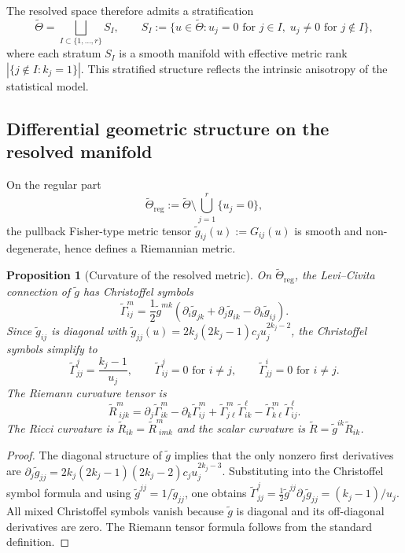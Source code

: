 \documentclass[11pt,letterpaper]{amsart}
\numberwithin{equation}{section}
\theoremstyle{plain}
\newtheorem{proposition}[theorem]{Proposition}
\theoremstyle{definition}
\theoremstyle{remark}
\begin{document}
The resolved space therefore admits a stratification
\[
\widetilde{\Theta} = \bigsqcup_{I \subset \{1,\dots,r\}} S_I,
\qquad
S_I := \{ u \in \widetilde{\Theta} : u_j = 0 \text{ for } j \in I, \; u_j \neq 0 \text{ for } j \notin I \},
\]
where each stratum $S_I$ is a smooth manifold with effective metric rank $|\{j \notin I : k_j = 1\}|$. This stratified structure reflects the intrinsic anisotropy of the statistical model.

\subsection{Differential geometric structure on the resolved manifold}

On the regular part
\[
\widetilde{\Theta}_{\mathrm{reg}} := \widetilde{\Theta} \setminus \bigcup_{j=1}^r \{u_j = 0\},
\]
the pullback Fisher-type metric tensor $\widetilde{g}_{ij}(u) := G_{ij}(u)$ is smooth and non-degenerate, hence defines a Riemannian metric.

\begin{proposition}[Curvature of the resolved metric]
\label{prop:curvature_resolved}
On $\widetilde{\Theta}_{\mathrm{reg}}$, the Levi--Civita connection of $\widetilde{g}$ has Christoffel symbols
\[
\widetilde{\Gamma}^m_{ij}
=
\frac{1}{2} \widetilde{g}^{mk}
\left(
\partial_i \widetilde{g}_{jk}
+
\partial_j \widetilde{g}_{ik}
-
\partial_k \widetilde{g}_{ij}
\right).
\]
Since $\widetilde{g}_{ij}$ is diagonal with $\widetilde{g}_{jj}(u) = 2k_j(2k_j-1)c_j u_j^{2k_j-2}$, the Christoffel symbols simplify to
\[
\widetilde{\Gamma}^j_{jj} = \frac{k_j - 1}{u_j}, \qquad
\widetilde{\Gamma}^j_{ij} = 0 \text{ for } i \neq j, \qquad
\widetilde{\Gamma}^i_{jj} = 0 \text{ for } i \neq j.
\]
The Riemann curvature tensor is
\[
\widetilde{R}^m_{\,\,ijk}
=
\partial_j \widetilde{\Gamma}^m_{ik}
-
\partial_k \widetilde{\Gamma}^m_{ij}
+
\widetilde{\Gamma}^m_{j\ell} \widetilde{\Gamma}^\ell_{ik}
-
\widetilde{\Gamma}^m_{k\ell} \widetilde{\Gamma}^\ell_{ij}.
\]
The Ricci curvature is $\widetilde{R}_{ik} = \widetilde{R}^m_{\,\,imk}$ and the scalar curvature is $\widetilde{R} = \widetilde{g}^{ik} \widetilde{R}_{ik}$.
\end{proposition}

\begin{proof}
The diagonal structure of $\widetilde{g}$ implies that the only nonzero first derivatives are $\partial_j \widetilde{g}_{jj} = 2k_j(2k_j-1)(2k_j-2)c_j u_j^{2k_j-3}$. Substituting into the Christoffel symbol formula and using $\widetilde{g}^{jj} = 1/\widetilde{g}_{jj}$, one obtains $\widetilde{\Gamma}^j_{jj} = \frac{1}{2}\widetilde{g}^{jj}\partial_j\widetilde{g}_{jj} = (k_j-1)/u_j$. All mixed Christoffel symbols vanish because $\widetilde{g}$ is diagonal and its off-diagonal derivatives are zero. The Riemann tensor formula follows from the standard definition.
\end{proof}
\end{document}
